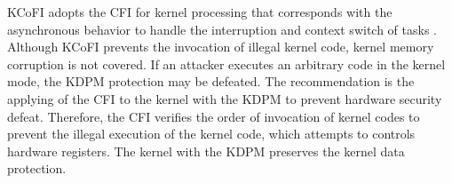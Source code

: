 KCoFI adopts the CFI for kernel processing that corresponds with the
asynchronous behavior to handle the interruption and context switch of tasks
\cite{criswell14sp}. Although KCoFI prevents the invocation of illegal kernel
code, kernel memory corruption is not covered.
%
If an attacker executes an arbitrary code in the kernel mode, the KDPM
protection may be defeated.
%
The recommendation is the applying of the CFI to the kernel with the KDPM to
prevent hardware security defeat. 
%
Therefore, the CFI verifies the order of invocation of kernel codes to prevent
the illegal execution of the kernel code, which attempts to controls hardware
registers. The kernel with the KDPM preserves the kernel data protection.








%


%



